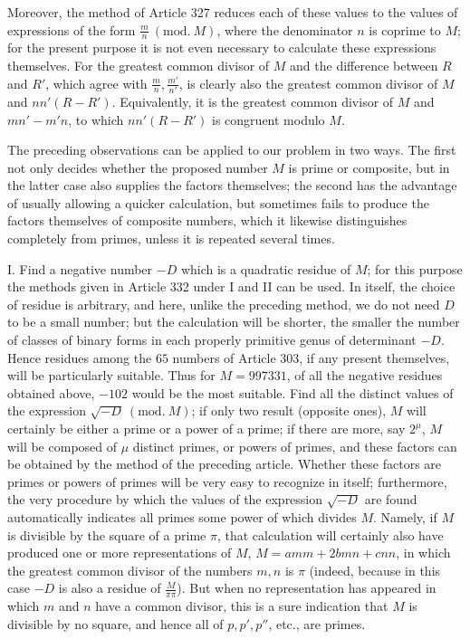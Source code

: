 Moreover, the method of Article 327 reduces each of these values to the values of expressions of the form \(\frac mn\ (\mathrm{mod.}\ M)\), where the denominator \(n\) is coprime to \(M\); for the present purpose it is not even necessary to calculate these expressions themselves. For the greatest common divisor of \(M\) and the difference between \(R\) and \(R'\), which agree with \(\frac mn,\allowbreak \frac{m'}{n'}\), is clearly also the greatest common divisor of \(M\) and \(nn'(R-R')\). Equivalently, it is the greatest common divisor of \(M\) and \(mn'-m'n\), to which \(nn'(R-R')\) is congruent modulo \(M\).

\enlargethispage{\baselineskip}
The preceding observations can be applied to our problem in two ways. The first not only decides whether the proposed number \(M\) is prime or composite, but in the latter case also supplies the factors themselves; the second has the advantage of usually allowing a quicker calculation, but sometimes fails to produce the factors themselves of composite numbers, which it likewise distinguishes completely from primes, unless it is repeated several times.

I. Find a negative number \(-D\) which is a quadratic residue of \(M\); for this purpose the methods given in Article 332 under I and II can be used. In itself, the choice of residue is arbitrary, and here, unlike the preceding method, we do not need \(D\) to be a small number; but the calculation will be shorter, the smaller the number of classes of binary forms in each properly primitive genus of determinant \(-D\). Hence residues among the \(65\) numbers of Article 303, if any present themselves, will be particularly suitable. Thus for \(M=997331\), of all the negative residues obtained above, \(-102\) would be the most
suitable. Find all the distinct values of the expression \(\surd{-D}\ (\mathrm{mod.}\ M)\); if only two result (opposite ones), \(M\) will certainly be either a prime or a power of a prime; if there are more, say \(2^\mu\), \(M\) will be composed of \(\mu\) distinct primes, or powers of primes, and these factors can be obtained by the method of the preceding article. Whether these factors are primes or powers of primes will be very easy to recognize in itself; furthermore, the very procedure by which the values of the expression \(\surd{-D}\) are found automatically indicates all primes some power of which divides \(M\). Namely, if \(M\) is divisible by the square of a prime \(\pi\), that calculation will certainly also have produced one or more representations of \(M\), \(M=amm+2bmn+cnn\), in which the greatest common divisor of the numbers \(m,\allowbreak n\) is \(\pi\) (indeed, because in this case \(-D\) is also a residue of \(\frac{M}{\pi\pi}\)). But when no representation has appeared in which \(m\) and \(n\) have a common divisor, this is a sure indication that \(M\) is divisible by no square, and hence all of \(p,\allowbreak p',\allowbreak p''\), etc., are primes.

